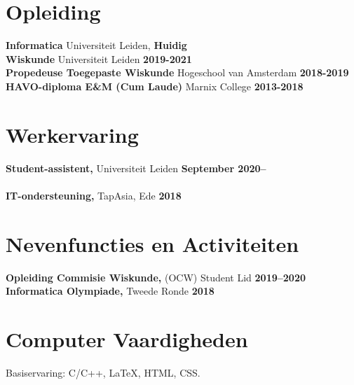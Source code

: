 \documentclass[margin,line]{res}
\begin{document}
\newcommand{\myname}{Tim Greven}
\newlength{\mynamewidth}
\settowidth{\mynamewidth}{\namefont\myname}

\name{\hspace*{0.5\textwidth}\hspace{-0.5\mynamewidth} \myname \vspace*{.1in}}
\thispagestyle{empty}






\section{\sc Opleiding}
{\bf Informatica} Universiteit Leiden, \hfill {\bf Huidig}\\

{\bf Wiskunde} Universiteit Leiden \hfill {\bf 2019-2021}\\
{\bf Propedeuse Toegepaste Wiskunde} Hogeschool van Amsterdam \hfill {\bf 2018-2019}\\
{\bf HAVO-diploma E\&M (Cum Laude)} Marnix College \hfill {\bf 2013-2018}\\


\section{\sc Werkervaring}
{\bf Student-assistent,} Universiteit Leiden \hfill {\bf September 2020--}\\
\\
{\bf IT-ondersteuning,} TapAsia, Ede \hfill {\bf  2018}\\

\vspace{-1em}


\vspace{-1em}


\section{\sc Nevenfuncties en Activiteiten}
{\bf Opleiding Commisie Wiskunde,} (OCW) Student Lid \hfill{\bf 2019--2020}
\\
{\bf Informatica Olympiade,} Tweede Ronde \hfill{\bf 2018}



\section{\sc Computer Vaardigheden}
Basiservaring: C/C++, \LaTeX, HTML, CSS.
\end{document}
